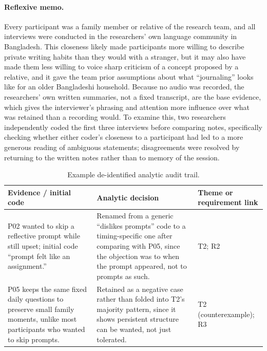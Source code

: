 \documentclass[sigconf,nonacm]{acmart}
\begin{document}
\paragraph{Reflexive memo.} Every participant was a family member or relative
of the research team, and all interviews were conducted in the researchers'
own language community in Bangladesh. This closeness likely made participants
more willing to describe private writing habits than they would with a
stranger, but it may also have made them less willing to voice sharp
criticism of a concept proposed by a relative, and it gave the team prior
assumptions about what ``journaling'' looks like for an older Bangladeshi
household. Because no audio was recorded, the researchers' own written
summaries, not a fixed transcript, are the base evidence, which gives the
interviewer's phrasing and attention more influence over what was retained
than a recording would. To examine this, two researchers independently coded
the first three interviews before comparing notes, specifically checking
whether either coder's closeness to a participant had led to a more generous
reading of ambiguous statements; disagreements were resolved by returning to
the written notes rather than to memory of the session.

\begin{table}[tb]
  \centering
  \small
  \caption{Example de-identified analytic audit trail.}
  \label{tab:audit}
  \begin{tabularx}{\textwidth}{@{}X X X@{}}
    \toprule
    Evidence / initial code & Analytic decision & Theme or requirement link \\
    \midrule
    P02 wanted to skip a reflective prompt while still upset; initial code
    ``prompt felt like an assignment.'' & Renamed from a generic ``dislikes
    prompts'' code to a timing-specific one after comparing with P05, since
    the objection was to when the prompt appeared, not to prompts as such. &
    T2; R2 \\
    P05 keeps the same fixed daily questions to preserve small family
    moments, unlike most participants who wanted to skip prompts. & Retained
    as a negative case rather than folded into T2's majority pattern, since
    it shows persistent structure can be wanted, not just tolerated. & T2
    (counterexample); R3 \\
    \bottomrule
  \end{tabularx}
\end{table}
\end{document}
